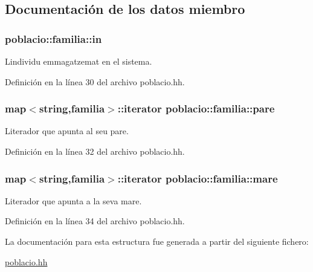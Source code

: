 \subsection{Documentación de los datos miembro}
\subsubsection[{\texorpdfstring{in}{in}}]{ poblacio\+::familia\+::in}\hypertarget{structpoblacio_1_1familia_a184e9fe52d7cf62ca133ac1d900f87ea}{}\label{structpoblacio_1_1familia_a184e9fe52d7cf62ca133ac1d900f87ea}


L\textquotesingle{}individu emmagatzemat en el sistema. 



Definición en la línea 30 del archivo poblacio.\+hh.

\subsubsection[{\texorpdfstring{pare}{pare}}]{\setlength{\rightskip}{0pt plus 5cm}map$<$string,{\bf familia}$>$\+::iterator poblacio\+::familia\+::pare}\hypertarget{structpoblacio_1_1familia_af87f56b016ade8b4bb02a49036de5f74}{}\label{structpoblacio_1_1familia_af87f56b016ade8b4bb02a49036de5f74}


L\textquotesingle{}iterador que apunta al seu pare. 



Definición en la línea 32 del archivo poblacio.\+hh.

\subsubsection[{\texorpdfstring{mare}{mare}}]{\setlength{\rightskip}{0pt plus 5cm}map$<$string,{\bf familia}$>$\+::iterator poblacio\+::familia\+::mare}\hypertarget{structpoblacio_1_1familia_a9d44bf543d7f856a93feac40de233c42}{}\label{structpoblacio_1_1familia_a9d44bf543d7f856a93feac40de233c42}


L\textquotesingle{}iterador que apunta a la seva mare. 



Definición en la línea 34 del archivo poblacio.\+hh.



La documentación para esta estructura fue generada a partir del siguiente fichero\+:\begin{DoxyCompactItemize}
\item 
\hyperlink{poblacio_8hh}{poblacio.\+hh}\end{DoxyCompactItemize}
